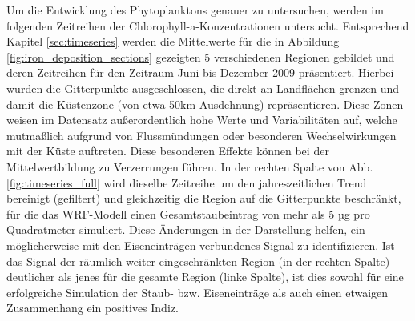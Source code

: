 \documentclass[12pt,a4paper,onecolumn,headheight=30pt]{scrartcl}
\begin{document}
Um die Entwicklung des Phytoplanktons genauer zu untersuchen, werden im folgenden Zeitreihen der Chlorophyll-a-Konzentrationen untersucht. Entsprechend Kapitel \ref{sec:timeseries} werden die Mittelwerte für die in Abbildung \ref{fig:iron_deposition_sections} gezeigten 5 verschiedenen Regionen gebildet und deren Zeitreihen für den Zeitraum Juni bis Dezember 2009 präsentiert. Hierbei wurden die Gitterpunkte ausgeschlossen, die direkt an Landflächen grenzen und damit die Küstenzone (von etwa 50km Ausdehnung) repräsentieren. Diese Zonen weisen im Datensatz außerordentlich hohe Werte und Variabilitäten auf, welche mutmaßlich aufgrund von Flussmündungen oder besonderen Wechselwirkungen mit der Küste auftreten. Diese besonderen Effekte können bei der Mittelwertbildung zu Verzerrungen führen. In der rechten Spalte von Abb. \ref{fig:timeseries_full} wird dieselbe Zeitreihe um den jahreszeitlichen Trend bereinigt (gefiltert) und gleichzeitig die Region auf die Gitterpunkte beschränkt, für die das WRF-Modell einen Gesamtstaubeintrag von mehr als 5 µg pro Quadratmeter simuliert. Diese Änderungen in der Darstellung helfen, ein möglicherweise mit den Eiseneinträgen verbundenes Signal zu identifizieren. Ist das Signal der räumlich weiter eingeschränkten Region (in der rechten Spalte) deutlicher als jenes für die gesamte Region (linke Spalte), ist dies sowohl für eine erfolgreiche Simulation der Staub- bzw. Eiseneinträge als auch einen etwaigen Zusammenhang ein positives Indiz. 
\end{document}
